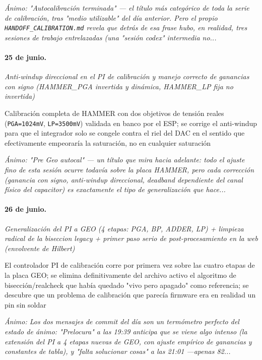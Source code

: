 {\footnotesize\itshape \'Animo: "Autocalibración terminada" --- el título más categórico de toda la serie de calibración, tras "medio utilizable" del día anterior. Pero el propio \texttt{HANDOFF\_CALIBRATION.md} revela que detrás de esa frase hubo, en realidad, tres sesiones de trabajo entrelazadas (una "sesión codex" intermedia no...}

\paragraph{25 de junio.}
\emph{Anti-windup direccional en el PI de calibración y manejo correcto de ganancias con signo (HAMMER\_PGA invertida y dinámica, HAMMER\_LP fija no invertida)}

Calibración completa de HAMMER con dos objetivos de tensión reales (\texttt{PGA=1024mV}, \texttt{LP=3500mV}) validada en banco por el ESP; se corrige el anti-windup para que el integrador solo se congele contra el riel del DAC en el sentido que efectivamente empeoraría la saturación, no en cualquier saturación

{\footnotesize\itshape \'Animo: "Pre Geo autocal" --- un título que mira hacia adelante: todo el ajuste fino de esta sesión ocurre todavía sobre la placa HAMMER, pero cada corrección (ganancia con signo, anti-windup direccional, deadband dependiente del canal físico del capacitor) es exactamente el tipo de generalización que hace...}

\paragraph{26 de junio.}
\emph{Generalización del PI a GEO (4 etapas: PGA, BP, ADDER, LP) + limpieza radical de la biseccion legacy + primer paso serio de post-procesamiento en la web (envolvente de Hilbert)}

El controlador PI de calibración corre por primera vez sobre las cuatro etapas de la placa GEO; se elimina definitivamente del archivo activo el algoritmo de bisección/realcheck que había quedado "vivo pero apagado" como referencia; se descubre que un problema de calibración que parecía firmware era en realidad un pin sin soldar

{\footnotesize\itshape \'Animo: Los dos mensajes de commit del día son un termómetro perfecto del estado de ánimo: "Prelocura" a las 19:39 anticipa que se viene algo intenso (la extensión del PI a 4 etapas nuevas de GEO, con ajuste empírico de ganancias y constantes de tabla), y "falta solucionar cosas" a las 21:01 ---apenas 82...}

